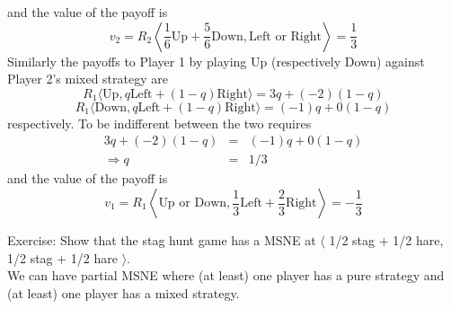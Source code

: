 \documentclass[]{report}
\begin{document}
	and the value of the payoff is
	$$ v_2 = R_2 \left\langle \frac{1}{6} \textrm{Up} + \frac{5}{6}\textrm{Down}, \textrm{Left or Right}\right\rangle  = \frac{1}{3} $$
	Similarly the payoffs to Player 1 by playing Up (respectively Down) against Player 2's mixed strategy are
	$$ R_1 \langle \textrm{Up}, q \textrm{Left} + (1-q)\textrm{Right}\rangle = 3q + (-2)(1-q) $$
	$$ R_1 \langle \textrm{Down}, q \textrm{Left} + (1-q)\textrm{Right} \rangle = (-1)q + 0(1-q) $$
	respectively. To be indifferent between the two requires
	\begin{eqnarray*}
		3q + (-2)(1-q) &=& (-1)q + 0(1-q) \\
		\Rightarrow q &=& 1/3
	\end{eqnarray*}
	and the value of the payoff is
	$$ v_1 = R_1 \left\langle \textrm{Up or Down}, \frac{1}{3} \textrm{Left} + \frac{2}{3}\textrm{Right}\right\rangle = -\frac{1}{3} $$
	
	Exercise: Show that the stag hunt game has a MSNE at $\langle$ 1/2 stag + 1/2 hare, 1/2 stag + 1/2 hare $\rangle$.\\
	
	We can have partial MSNE where (at least) one player has a pure strategy and (at least) one player has a mixed strategy.\\
	
\end{document}
